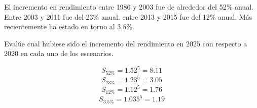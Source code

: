 \begin{acexercise}\end{acexercise}

El incremento en rendimiento entre 1986 y 2003 fue de alrededor del 52\% anual.
Entre 2003 y 2011 fue del 23\% anual.
entre 2013 y 2015 fue del 12\% anual.
Más recientemente ha estado en torno al $3.5$\%.

Evalúe cual hubiese sido el incremento del rendimiento en 2025 con respecto
a 2020 en cada uno de los escenarios.

\begin{acsolution}\end{acsolution}

\[S_{52\%} = 1.52^5 = 8.11\]
\[S_{23\%} = 1.23^5 = 3.05\]
\[S_{12\%} = 1.12^5 = 1.76\]
\[S_{3.5\%} = 1.035^5 = 1.19\]

